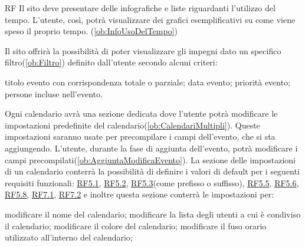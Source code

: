 \begin{listaPersonale}{RF}
	 Il sito deve presentare delle infografiche e liste riguardanti l'utilizzo del tempo. L'utente, così, potrà visualizzare dei grafici esemplificativi su come viene speso il proprio tempo. (\ref{ob:InfoUsoDelTempo})

	 Il sito offrirà la possibilità di poter visualizzare gli impegni dato un specifico filtro(\ref{ob:Filtro}) definito dall'utente secondo alcuni criteri:
	\begin{listaPersonale2}{}
		 titolo evento con corrispondenza totale o parziale;
		 data evento;
		 priorità evento;
		 persone incluse nell'evento.
	\end{listaPersonale2}

	 Ogni calendario avrà una sezione dedicata dove l'utente potrà modificare le impostazioni predefinite del calendario(\ref{ob:CalendariMultipli}). Queste impostazioni saranno usate per precompilare i campi dell'evento, che si sta aggiungendo. L'utente, durante la fase di aggiunta dell'evento, potrà modificare i campi precompilati(\ref{ob:AggiuntaModificaEvento}). La sezione delle impostazioni di un calendario conterrà la possibilità di definire i valori di default per i seguenti requisiti funzionali: \hyperref[rf:RestrizioniEvento]{RF5.1}, \hyperref[rf:PrioritaEvento]{RF5.2}, \hyperref[rf:DescrizioneTitoloEvento]{RF5.3}(come prefisso o suffisso), \hyperref[rf:LuogoEvento]{RF5.5}, \hyperref[rf:CondivisioneEvento]{RF5.6}, \hyperref[rf:DifficoltaEvento]{RF5.8}, \hyperref[rf:ImpostazioneTimerNotifiche]{RF7.1}, \hyperref[rf:TitoloNotifiche]{RF7.2} e inoltre questa sezione conterrà le impostazioni per:
	\begin{listaPersonale2}{}
		 modificare il nome del calendario;
		 modificare la lista degli utenti a cui è condiviso il calendario;
		 modificare il colore del calendario;
		 modificare il fuso orario utilizzato all'interno del calendario;

	\end{listaPersonale2}


\end{listaPersonale}
